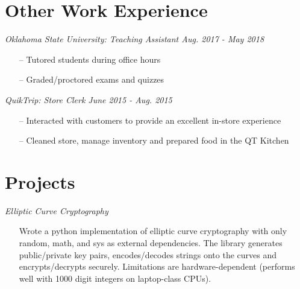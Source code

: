 \documentclass[line,overlapped,9pt]{res}
\begin{document}
\begin{resume}
    \section{Other Work Experience}

            {\sl Oklahoma State University: Teaching Assistant \hfill Aug. 2017 - May 2018}
            \begin{itemize}  %
            \item[--] Tutored students during office hours 
            \item[--] Graded/proctored exams and quizzes
            \end{itemize} 

            {\sl QuikTrip: Store Clerk \hfill June 2015 - Aug. 2015}
            \begin{itemize} 
            \item[--] Interacted with customers to provide an excellent in-store experience 
            \item[--] Cleaned store, manage inventory and prepared food in the QT Kitchen 
            \end{itemize}

     \section{Projects}
             
            {\sl Elliptic Curve Cryptography} 
            \begin{itemize} 
            \item[] Wrote a python implementation of elliptic curve cryptography with only random, math, and sys
              as external dependencies. The library generates public/private key pairs, encodes/decodes strings
              onto the curves and encrypts/decrypts securely. Limitations are hardware-dependent (performs well
              with 1000 digit integers on laptop-class CPUs). 
              \end{itemize}
       
\end{resume}
\end{document}
